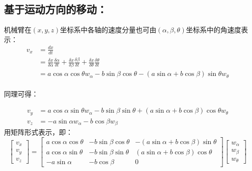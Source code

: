 \subsection{基于运动方向的移动：}

机械臂在$(x,y,z)$坐标系中各轴的速度分量也可由$(\alpha,\beta,\theta)$坐标系中的角速度表示：
	\begin{displaymath}
		\begin{aligned}
			{v_x}& = \frac{{dx}}{{dt}}\\ &= \frac{{\delta x}}{{\delta \alpha }}\frac{{\delta \alpha }}{{\delta t}} + \frac{{\delta x}}{{\delta \beta }}\frac{{\delta \beta }}{{\delta t}} + \frac{{\delta x}}{{\delta \theta }}\frac{{\delta \theta }}{{\delta t}} \\&= a\cos \alpha \cos \theta {w_\alpha } - b\sin \beta \cos \theta  - (a\sin \alpha  + b\cos \beta )\sin \theta {w_\theta }\\		
		\end{aligned}
	\end{displaymath}
	
	同理可得：
	
	\begin{displaymath}
		\begin{aligned}
			{v_y} &= a\cos \alpha \sin \theta {w_\alpha } - b\sin \beta \sin \theta  + (a\sin \alpha  + b\cos \beta )\cos \theta {w_\theta }\\
			{v_z} &=  - a\sin \alpha {w_\alpha } - b\cos \beta {w_\beta }
		\end{aligned}
	\end{displaymath}
	用矩阵形式表示，即：
	\begin{displaymath}
		\left[ {\begin{array}{*{20}{c}}
				{{v_x}}\\
				{{v_y}}\\
				{{v_z}}
		\end{array}} \right] = \left[ {\begin{array}{*{20}{c}}
				{a\cos \alpha \cos \theta }&{ - b\sin \beta \cos \theta }&{ - (a\sin \alpha  + b\cos \beta )\sin \theta }\\
				{a\cos \alpha \sin \theta }&{ - b\sin \beta \sin \theta }&{(a\sin \alpha  + b\cos \beta )\cos \theta }\\
				{ - a\sin \alpha }&{ - b\cos \beta }&0
		\end{array}} \right]\left[ {\begin{array}{*{20}{c}}
				{{w_\alpha }}\\
				{{w_\beta }}\\
				{{w_\theta }}
		\end{array}} \right]
	\end{displaymath}
	
